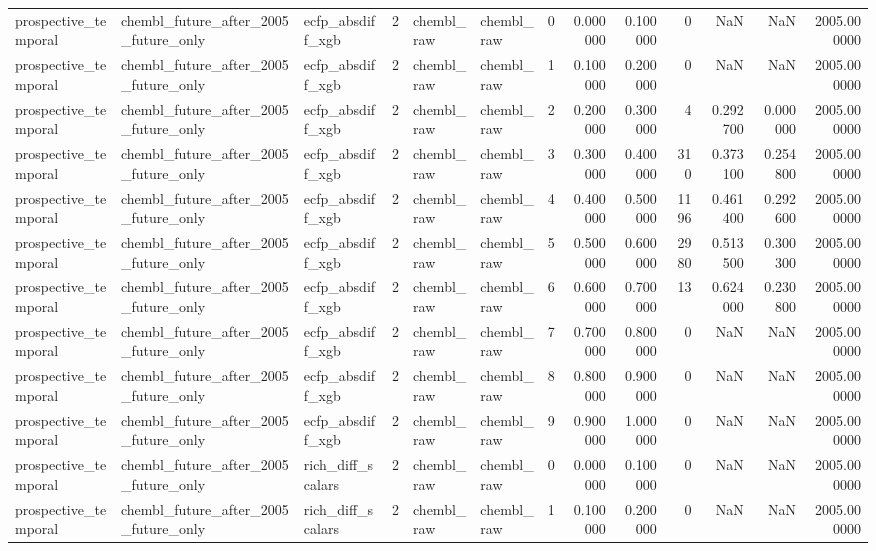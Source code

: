 \begin{longtable}{lllrllrrrrrrr}
prospective\_temporal & chembl\_future\_after\_2005\_future\_only & ecfp\_absdiff\_xgb & 2 & chembl\_raw & chembl\_raw & 0 & 0.000000 & 0.100000 & 0 & NaN & NaN & 2005.000000 \\
prospective\_temporal & chembl\_future\_after\_2005\_future\_only & ecfp\_absdiff\_xgb & 2 & chembl\_raw & chembl\_raw & 1 & 0.100000 & 0.200000 & 0 & NaN & NaN & 2005.000000 \\
prospective\_temporal & chembl\_future\_after\_2005\_future\_only & ecfp\_absdiff\_xgb & 2 & chembl\_raw & chembl\_raw & 2 & 0.200000 & 0.300000 & 4 & 0.292700 & 0.000000 & 2005.000000 \\
prospective\_temporal & chembl\_future\_after\_2005\_future\_only & ecfp\_absdiff\_xgb & 2 & chembl\_raw & chembl\_raw & 3 & 0.300000 & 0.400000 & 310 & 0.373100 & 0.254800 & 2005.000000 \\
prospective\_temporal & chembl\_future\_after\_2005\_future\_only & ecfp\_absdiff\_xgb & 2 & chembl\_raw & chembl\_raw & 4 & 0.400000 & 0.500000 & 1196 & 0.461400 & 0.292600 & 2005.000000 \\
prospective\_temporal & chembl\_future\_after\_2005\_future\_only & ecfp\_absdiff\_xgb & 2 & chembl\_raw & chembl\_raw & 5 & 0.500000 & 0.600000 & 2980 & 0.513500 & 0.300300 & 2005.000000 \\
prospective\_temporal & chembl\_future\_after\_2005\_future\_only & ecfp\_absdiff\_xgb & 2 & chembl\_raw & chembl\_raw & 6 & 0.600000 & 0.700000 & 13 & 0.624000 & 0.230800 & 2005.000000 \\
prospective\_temporal & chembl\_future\_after\_2005\_future\_only & ecfp\_absdiff\_xgb & 2 & chembl\_raw & chembl\_raw & 7 & 0.700000 & 0.800000 & 0 & NaN & NaN & 2005.000000 \\
prospective\_temporal & chembl\_future\_after\_2005\_future\_only & ecfp\_absdiff\_xgb & 2 & chembl\_raw & chembl\_raw & 8 & 0.800000 & 0.900000 & 0 & NaN & NaN & 2005.000000 \\
prospective\_temporal & chembl\_future\_after\_2005\_future\_only & ecfp\_absdiff\_xgb & 2 & chembl\_raw & chembl\_raw & 9 & 0.900000 & 1.000000 & 0 & NaN & NaN & 2005.000000 \\
prospective\_temporal & chembl\_future\_after\_2005\_future\_only & rich\_diff\_scalars & 2 & chembl\_raw & chembl\_raw & 0 & 0.000000 & 0.100000 & 0 & NaN & NaN & 2005.000000 \\
prospective\_temporal & chembl\_future\_after\_2005\_future\_only & rich\_diff\_scalars & 2 & chembl\_raw & chembl\_raw & 1 & 0.100000 & 0.200000 & 0 & NaN & NaN & 2005.000000 \\

\end{longtable}
